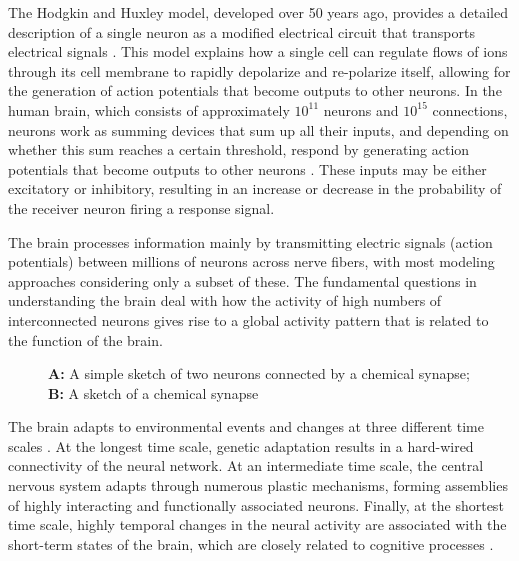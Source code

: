 \documentclass[12pt,a4paper]{report}
\begin{document}
The Hodgkin and Huxley model, developed over 50 years ago, provides a detailed description of a single neuron as a modified electrical circuit that transports electrical signals \cite{ref4}. This model explains how a single cell can regulate flows of ions through its cell membrane to rapidly depolarize and re-polarize itself, allowing for the generation of action potentials that become outputs to other neurons. In the human brain, which consists of approximately \(10^{11}\) neurons and \(10^{15}\) connections, neurons work as summing devices that sum up all their inputs, and depending on whether this sum reaches a certain threshold, respond by generating action potentials that become outputs to other neurons \cite{ref5}. These inputs may be either excitatory or inhibitory, resulting in an increase or decrease in the probability of the receiver neuron firing a response signal.

The brain processes information mainly by transmitting electric signals (action potentials) between millions of neurons across nerve fibers, with most modeling approaches considering only a subset of these. The fundamental questions in understanding the brain deal with how the activity of high numbers of interconnected neurons gives rise to a global activity pattern that is related to the function of the brain.


\begin{figure}[H]
    \centering %
    \caption[A: A simple sketch of two neurons connected by a chemical synapse; B: A sketch of a chemical synapse]{\textbf{A:} A simple sketch of two neurons connected by a chemical synapse; \\ \textbf{B:} A sketch of a chemical synapse} 
\end{figure}
    
The brain adapts to environmental events and changes at three different time scales  \cite{ref6}. At the longest time scale, genetic adaptation results in a hard-wired connectivity of the neural network. At an intermediate time scale, the central nervous system adapts through numerous plastic mechanisms, forming assemblies of highly interacting and functionally associated neurons. Finally, at the shortest time scale, highly temporal changes in the neural activity are associated with the short-term states of the brain, which are closely related to cognitive processes \cite{ref7}.
\end{document}

